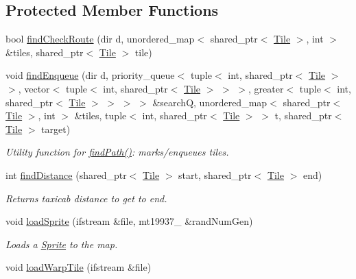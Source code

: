 \subsection*{Protected Member Functions}
\begin{DoxyCompactItemize}
\item 
bool \hyperlink{class_terr_a34bf50aa821f3c2f861c060281e238c3}{find\+Check\+Route} (dir d, unordered\+\_\+map$<$ shared\+\_\+ptr$<$ \hyperlink{class_tile}{Tile} $>$, int $>$ \&tiles, shared\+\_\+ptr$<$ \hyperlink{class_tile}{Tile} $>$ tile)
\item 
void \hyperlink{class_terr_a1784db5125ce598d59b68bb0edde9196}{find\+Enqueue} (dir d, priority\+\_\+queue$<$ tuple$<$ int, shared\+\_\+ptr$<$ \hyperlink{class_tile}{Tile} $>$ $>$, vector$<$ tuple$<$ int, shared\+\_\+ptr$<$ \hyperlink{class_tile}{Tile} $>$ $>$ $>$, greater$<$ tuple$<$ int, shared\+\_\+ptr$<$ \hyperlink{class_tile}{Tile} $>$ $>$ $>$ $>$ \&searchQ, unordered\+\_\+map$<$ shared\+\_\+ptr$<$ \hyperlink{class_tile}{Tile} $>$, int $>$ \&tiles, tuple$<$ int, shared\+\_\+ptr$<$ \hyperlink{class_tile}{Tile} $>$ $>$ t, shared\+\_\+ptr$<$ \hyperlink{class_tile}{Tile} $>$ target)\hypertarget{class_terr_a1784db5125ce598d59b68bb0edde9196}{}\label{class_terr_a1784db5125ce598d59b68bb0edde9196}

\begin{DoxyCompactList}\small\item\em Utility function for \hyperlink{class_terr_ad0596843b8e4c1ddd9b39220837b88ce}{find\+Path()}\+: marks/enqueues tiles. \end{DoxyCompactList}\item 
int \hyperlink{class_terr_a76e437b2864d6fd78b85961dbe1ade61}{find\+Distance} (shared\+\_\+ptr$<$ \hyperlink{class_tile}{Tile} $>$ start, shared\+\_\+ptr$<$ \hyperlink{class_tile}{Tile} $>$ end)\hypertarget{class_terr_a76e437b2864d6fd78b85961dbe1ade61}{}\label{class_terr_a76e437b2864d6fd78b85961dbe1ade61}

\begin{DoxyCompactList}\small\item\em Returns taxicab distance to get to end. \end{DoxyCompactList}\item 
void \hyperlink{class_terr_aa852f49a6b3c0aeca839809f01dc6817}{load\+Sprite} (ifstream \&file, mt19937\+\_ \&rand\+Num\+Gen)\hypertarget{class_terr_aa852f49a6b3c0aeca839809f01dc6817}{}\label{class_terr_aa852f49a6b3c0aeca839809f01dc6817}

\begin{DoxyCompactList}\small\item\em Loads a \hyperlink{class_sprite}{Sprite} to the map. \end{DoxyCompactList}\item 
void \hyperlink{class_terr_ade4dc4c2e3c5746d7274ff7849b60e38}{load\+Warp\+Tile} (ifstream \&file)\hypertarget{class_terr_ade4dc4c2e3c5746d7274ff7849b60e38}{}\label{class_terr_ade4dc4c2e3c5746d7274ff7849b60e38}


\end{DoxyCompactItemize}
